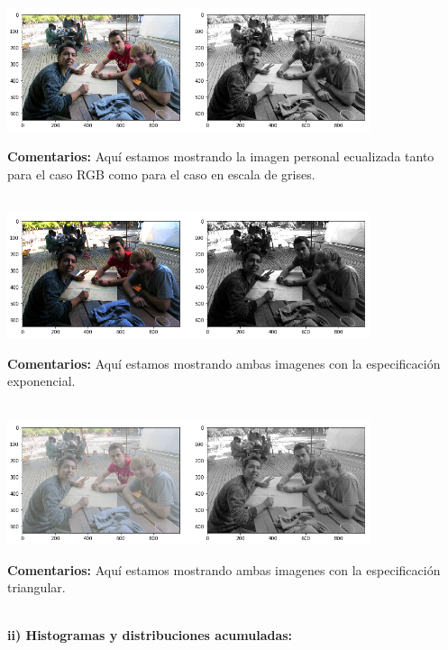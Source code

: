 \documentclass[11pt]{article}
\begin{document}
\begin{center}
\includegraphics[width=0.8\textwidth]{./figures/beto_ecualizado}
\end{center}

\textbf{Comentarios:} Aquí estamos mostrando la imagen personal ecualizada tanto para el caso RGB como para el caso en escala de grises. \\

$ \ $ 

\begin{center}
\includegraphics[width=0.8\textwidth]{./figures/beto_exponencial}
\end{center}

\textbf{Comentarios:} Aquí estamos mostrando ambas imagenes con la especificación exponencial. \\

$ \ $ 

\begin{center}
\includegraphics[width=0.8\textwidth]{./figures/beto_triangular}
\end{center}

\textbf{Comentarios:} Aquí estamos mostrando ambas imagenes con la especificación triangular. \\


$ \ $ 

\textbf{ii) Histogramas y distribuciones acumuladas:} \\
\end{document}
